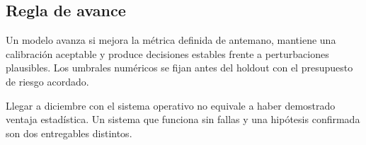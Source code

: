 \subsection{Regla de avance}\label{sec:avance}

\begin{criterio}
Un modelo avanza si mejora la métrica definida de antemano, mantiene una calibración aceptable y produce
decisiones estables frente a perturbaciones plausibles. Los umbrales numéricos se fijan antes del holdout
con el presupuesto de riesgo acordado.
\end{criterio}

\begin{noconcluir}
Llegar a diciembre con el sistema operativo no equivale a haber demostrado ventaja estadística. Un sistema
que funciona sin fallas y una hipótesis confirmada son dos entregables distintos.
\end{noconcluir}
